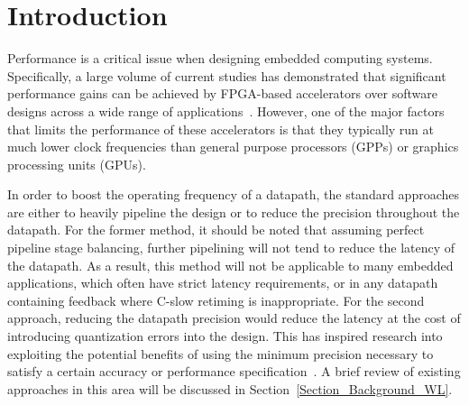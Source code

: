 \documentclass[prodmode,acmtrets]{acmsmall} %
\begin{document}
\maketitle


\section{Introduction}

Performance is a critical issue when designing embedded computing systems. Specifically, a large volume of current studies has demonstrated that significant performance gains can be achieved by FPGA-based accelerators over software designs across a wide range of applications~\cite{UnderwoodFPGAvsCPU,David_MINRES}. However, one of the major factors that limits the performance of these accelerators is that they typically run at much lower clock frequencies than general purpose processors (GPPs) or graphics processing units (GPUs).

In order to boost the operating frequency of a datapath, the standard approaches are either to heavily pipeline the design or to reduce the precision throughout the datapath. For the former method, it should be noted that assuming perfect pipeline stage balancing, further pipelining will not tend to reduce the latency of the datapath. As a result, this method will not be applicable to many embedded applications, which often have strict latency requirements, or in any datapath containing feedback where C-slow retiming is inappropriate. For the second approach, reducing the datapath precision would reduce the latency at the cost of introducing quantization errors into the design. This has inspired research into exploiting the potential benefits of using the minimum precision necessary to satisfy a certain accuracy or performance specification~\cite{GeorgeDT11}. A brief review of existing approaches in this area will be discussed in Section~\ref{Section_Background_WL}.
\end{document}
